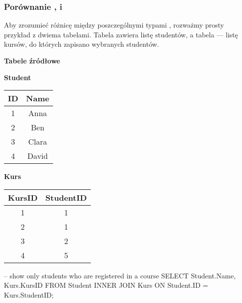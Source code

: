 \subsubsection{Porównanie ,  i }

Aby zrozumieć różnicę między poszczególnymi typami , rozważmy prosty przykład z dwiema tabelami.  
Tabela  zawiera listę studentów, a tabela  — listę kursów, do których zapisano wybranych studentów.

\begin{table}[H]
    \centering
    \textbf{Tabele źródłowe} \\ [10pt]
    \begin{minipage}[t]{0.4\textwidth}
        \centering
        \textbf{Student} \\[3pt]
        \begin{tabular}{|c|c|}
            \hline
            \textbf{ID} & \textbf{Name} \\
            \hline
            1 & Anna \\
            2 & Ben \\
            3 & Clara \\
            4 & David \\ %
            \hline
        \end{tabular}
    \end{minipage}
    \hspace{0.3cm}
    \begin{minipage}[t]{0.4\textwidth}
        \centering
        \textbf{Kurs} \\ [3pt]
        \begin{tabular}{|c|c|}
            \hline
            \textbf{KursID} & \textbf{StudentID} \\
            \hline
            1 & 1 \\
            2 & 1 \\
            3 & 2 \\
            4 & 5 \\ %
            \hline
        \end{tabular}
    \end{minipage}
\end{table}

\begin{sql}
-- show only students who are registered in a course
SELECT Student.Name, Kurs.KursID
    FROM Student
    INNER JOIN Kurs ON Student.ID = Kurs.StudentID;
\end{sql}


